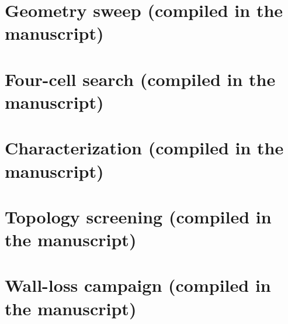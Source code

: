 \documentclass[11pt]{article}
\begin{document}
\section{Geometry sweep (compiled in the manuscript)}\label{sec:l1a-sweep-v2}
\section{Four-cell search (compiled in the manuscript)}\label{sec:four-cell-v2}
\section{Characterization (compiled in the manuscript)}\label{sec:topology-char-v1}
\section{Topology screening (compiled in the manuscript)}\label{sec:topology-screening}
\section{Wall-loss campaign (compiled in the manuscript)}\label{sec:wall-loss-v4}

\end{document}
